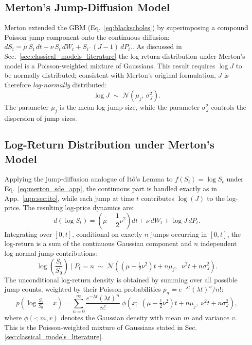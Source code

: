 \subsection{Merton's Jump-Diffusion Model}

Merton \cite{merton1976option} extended the GBM (Eq.\ \ref{eq:blackscholes}) by
superimposing a compound Poisson jump component onto the continuous diffusion:\(
    \label{eq:merton_sde_app}
    dS_t = \mu\, S_t\, dt + \nu\, S_t\, dW_t + S_{t^-}(J - 1)\, dP_t.
\). As discussed in Sec.\ \ref{sec:classical_models_literature} the log-return distribution under Merton's model is a Poisson-weighted mixture of
Gaussians. This result requires $\log J$ to be normally distributed; consistent
with Merton's \cite{merton1976option} original formulation, $J$ is therefore \textit{log-normally}
distributed:
\begin{equation}
    \label{eq:jump_lognormal_app}
    \log J \;\sim\; \mathcal{N}(\mu_j,\, \sigma_J^2).
\end{equation}
The parameter $\mu_j$ is the mean log-jump size, while the parameter $\sigma_J^2$ controls the dispersion of jump
sizes.

\subsection{Log-Return Distribution under Merton's Model}

Applying the jump-diffusion analogue of It\^{o}'s Lemma to $f(S_t) = \log S_t$
under Eq.\ \ref{eq:merton_sde_app}, the continuous part is handled exactly as
in App.\ \ref{app:sec:ito}, while each jump at time $t$ contributes
$\log(J)$ to the log-price. The resulting log-price dynamics are:
\[
    d(\log S_t) = \left(\mu - \frac{1}{2}\nu^2\right)\! dt
                + \nu\, dW_t + \log J\, dP_t.
\]
Integrating over $[0, t]$, conditional on exactly $n$ jumps occurring in
$[0, t]$, the log-return is a sum of the continuous
Gaussian component and $n$ independent log-normal jump contributions:
\[
    \log\!\left(\frac{S_t}{S_0}\right) \;\Bigg|\; P_t = n
    \;\sim\; \mathcal{N}\!\left(\left(\mu - \tfrac{1}{2}\nu^2\right)t
    + n\mu_j,\;\; \nu^2 t + n\sigma_J^2\right).
\]
The unconditional log-return density is obtained by summing over all
possible jump counts, weighted by their Poisson probabilities
$p_n = e^{-\lambda t}(\lambda t)^n / n!$:
\begin{equation}
    \label{eq:merton_return_dist}
    p\!\left(\log\tfrac{S_t}{S_0} = x\right)
    = \sum_{n=0}^{\infty}
    \frac{e^{-\lambda t}(\lambda t)^n}{n!}\;
    \phi\!\left(x;\;
    \left(\mu - \tfrac{1}{2}\nu^2\right)t + n\mu_j,\;
    \nu^2 t + n\sigma_J^2\right),
\end{equation}
where $\phi(\cdot;\, m, v)$ denotes the Gaussian density with mean $m$ and
variance $v$. This is the Poisson-weighted mixture of Gaussians stated in
Sec. \ref{sec:classical_models_literature}.

